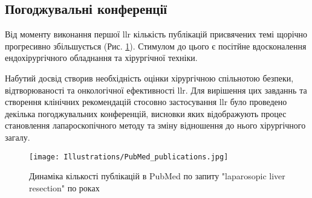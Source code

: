 \subsection{Погоджувальні конференції}

Від моменту виконання першої \acrshort{llr} кількість публікацій присвячених темі щорічно прогресивно збільшується (Рис. \ref{fig:PubMed_publications}). Стимулом до цього є посітйне вдосконалення ендохірургічного обладнання та хірургічної техніки.

Набутий досвід створив необхідність оцінки хірургічною спільнотою безпеки, відтворюваності та онкологічної ефективності \acrshort{llr}. Для вирішення цих завданнь та створення клінічних рекомендацій стосовно застосування \acrshort{llr} було  проведено декілька погоджувальних конференцій, висновки яких відображують процес становлення лапароскопічного методу та зміну відношення до нього хірургічного загалу. 

\begin{figure}[h]
\caption{Динаміка кількості публікацій в PubMed по запиту "laparosopic liver resection" по роках \cite{Hashizume1995}}
\centering
\texttt{[image: Illustrations/PubMed\_publications.jpg]}
\label{fig:PubMed_publications}
\end{figure}

